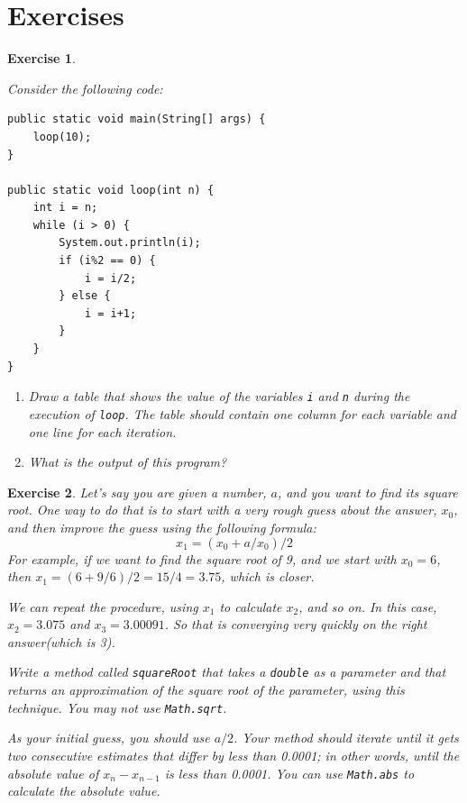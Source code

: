 \documentclass[12pt]{book}
\theoremstyle{exercise}
\newtheorem{exercise}{Exercise}[chapter]
\begin{document}
\section{Exercises}

\begin{exercise}
\label{infloop}

Consider the following code:

\begin{lstlisting}
public static void main(String[] args) {
    loop(10);
}

public static void loop(int n) {
    int i = n;
    while (i > 0) {
        System.out.println(i);
        if (i%2 == 0) {
            i = i/2;
        } else {
            i = i+1;
        }
    }
}
\end{lstlisting}
%
\begin{enumerate}

\item Draw a table that shows the value of the variables {\tt i}
and {\tt n} during the execution of {\tt loop}.  The table should
contain one column for each variable and one line for each
iteration.

\item What is the output of this program?

\end{enumerate}
\end{exercise}


\begin{exercise}
Let's say you are given a number, $a$, and you want to find
its square root.  One way to do that is to start with a very
rough guess about the answer, $x_0$, and then improve
the guess using the following formula:
%
\begin{equation*}
x_1 =(x_0 + a/x_0) / 2
\end{equation*}
%
For example, if we want to find the square root of 9, and
we start with $x_0 = 6$, then $x_1 =(6 + 9/6) /2 = 15/4 = 3.75$,
which is closer.

We can repeat the procedure, using $x_1$ to calculate $x_2$,
and so on.  In this case, $x_2 = 3.075$ and $x_3 = 3.00091$.
So that is converging very quickly on the right answer(which
is 3).

Write a method called {\tt squareRoot} that takes a {\tt double}
as a parameter and that returns an approximation of the square
root of the parameter, using this technique.  You may not use
{\tt Math.sqrt}.

As your initial guess, you should use $a/2$.  Your method should
iterate until it gets two consecutive estimates that differ by less
than 0.0001; in other words, until the absolute value of $x_n -
x_{n-1}$ is less than 0.0001.  You can use {\tt Math.abs} to calculate
the absolute value.
\end{exercise}
\end{document}
